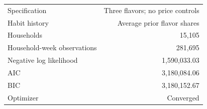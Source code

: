 \begin{tabular}{lr}\toprule
Specification & Three flavors; no price controls\\
Habit history & Average prior flavor shares\\
Households & 15,105 \\
Household-week observations & 281,695 \\
Negative log likelihood & 1,590,033.03 \\
AIC & 3,180,084.06 \\
BIC & 3,180,152.67 \\
Optimizer & Converged\\\bottomrule\end{tabular}

